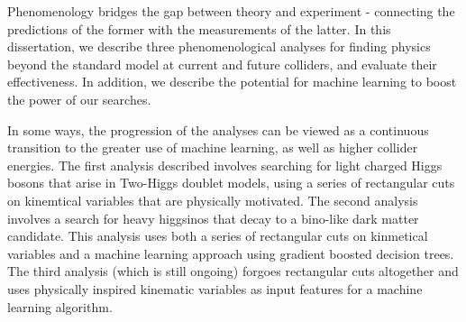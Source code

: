 Phenomenology bridges the gap between theory and experiment - connecting the predictions of the former with the measurements of the latter. In this dissertation, we describe three phenomenological analyses for finding physics beyond the standard model at current and future colliders, and evaluate their effectiveness. In addition, we describe the potential for machine learning to boost the power of our searches.

In some ways, the progression of the analyses can be viewed as a continuous transition to the greater use of machine learning, as well as higher collider energies. The first analysis described involves searching for light charged Higgs bosons that arise in Two-Higgs doublet models, using a series of rectangular cuts on kinemtical variables that are physically motivated. The second analysis involves a search for heavy higgsinos that decay to a bino-like dark matter candidate. This analysis uses both a series of rectangular cuts on kinmetical variables and a machine learning approach using gradient boosted decision trees. The third analysis (which is still ongoing) forgoes rectangular cuts altogether and uses physically inspired kinematic variables as input features for a machine learning algorithm.

